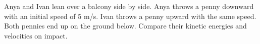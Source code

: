 Anya and Ivan lean over a balcony side by side. Anya throws a penny downward with
        an initial speed of 5 m/s. Ivan throws a penny upward with the same speed. Both pennies
        end up on the ground below. Compare their kinetic energies and velocities on impact.
